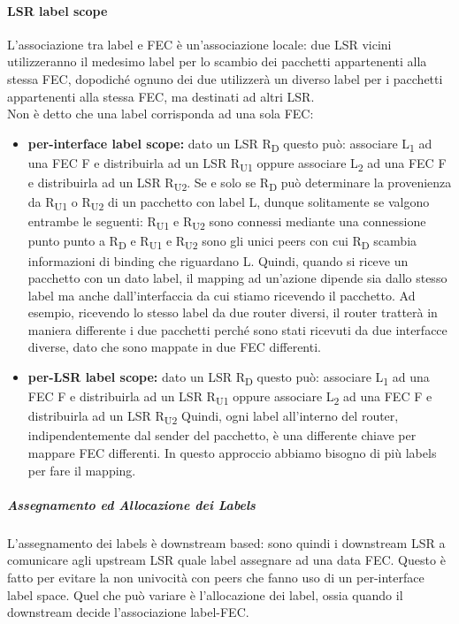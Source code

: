 \documentclass{article}
\begin{document}
\paragraph{LSR label scope} L'associazione tra label e FEC è un'associazione locale: due LSR vicini utilizzeranno il medesimo label per lo scambio dei pacchetti appartenenti alla stessa FEC, dopodiché ognuno dei due utilizzerà un diverso label per i pacchetti appartenenti alla stessa FEC, ma destinati ad altri LSR. \\ Non è detto che una label corrisponda ad una sola FEC:
\begin{itemize}
    \item \textbf{per-interface label scope:} dato un LSR  R\textsubscript{D} questo può: associare L\textsubscript{1} ad una FEC F e distribuirla ad un LSR R\textsubscript{U1} oppure associare L\textsubscript{2} ad una FEC F e distribuirla ad un LSR R\textsubscript{U2}. Se e solo se R\textsubscript{D} può determinare la provenienza da R\textsubscript{U1} o R\textsubscript{U2} di un pacchetto con label L, dunque solitamente se valgono entrambe le seguenti: R\textsubscript{U1} e R\textsubscript{U2} sono connessi mediante una connessione punto punto a R\textsubscript{D} e R\textsubscript{U1} e R\textsubscript{U2} sono gli unici peers con cui R\textsubscript{D} scambia informazioni di binding che riguardano L. Quindi, quando si riceve un pacchetto con un dato label, il mapping ad un'azione dipende sia dallo stesso label ma anche dall'interfaccia da cui stiamo ricevendo il pacchetto. Ad esempio, ricevendo lo stesso label da due router diversi, il router tratterà in maniera differente i due pacchetti perché sono stati ricevuti da due interfacce diverse, dato che sono mappate in due FEC differenti.
    \item \textbf{per-LSR label scope:} dato un LSR  R\textsubscript{D} questo può: associare L\textsubscript{1} ad una FEC F e distribuirla ad un LSR R\textsubscript{U1} oppure associare L\textsubscript{2} ad una FEC F e distribuirla ad un LSR R\textsubscript{U2} Quindi, ogni label all'interno del router, indipendentemente dal sender del pacchetto, è una differente chiave per mappare FEC differenti. In questo approccio abbiamo bisogno di più labels per fare il mapping.
\end{itemize}

\subparagraph{Assegnamento ed Allocazione dei Labels} L'assegnamento dei labels è downstream based: sono quindi i downstream LSR a comunicare agli upstream LSR quale label assegnare ad una data FEC. Questo è fatto per evitare la non univocità con peers che fanno uso di un per-interface label space. Quel che può variare è l'allocazione dei label, ossia quando il downstream decide l'associazione label-FEC.
\end{document}
